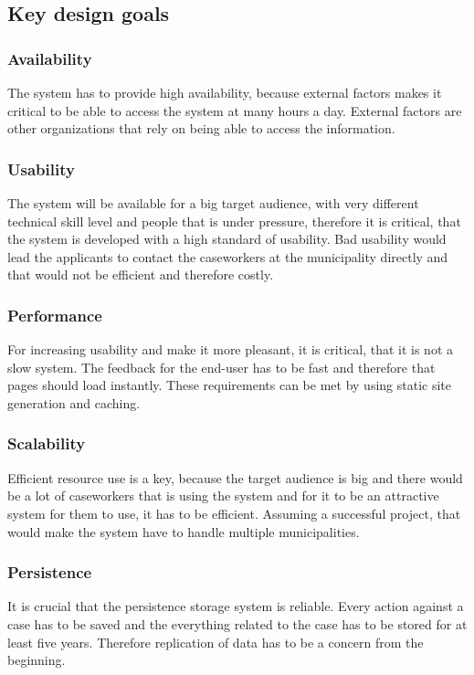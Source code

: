 \subsection{Key design goals}

\subsubsection{Availability}
The system has to provide high availability, because external factors makes it critical to be able to access the system at many hours a day. External factors are other organizations that rely on being able to access the information. 

\subsubsection{Usability}
The system will be available for a big target audience, with very different technical skill level and people that is under pressure, therefore it is critical, that the system is developed with a high standard of usability. Bad usability would lead the applicants to contact the caseworkers at the municipality directly and that would not be efficient and therefore costly. 

\subsubsection{Performance}
For increasing usability and make it more pleasant, it is critical, that it is not a slow system. The feedback for the end-user has to be fast and therefore that pages should load instantly. These requirements can be met by using static site generation and caching. 

\subsubsection{Scalability}
Efficient resource use is a key, because the target audience is big and there would be a lot of caseworkers that is using the system and for it to be an attractive system for them to use, it has to be efficient. Assuming a successful project, that would make the system have to handle multiple municipalities.

\subsubsection{Persistence}
It is crucial that the persistence storage system is reliable. Every action against a case has to be saved and the everything related to the case has to be stored for at least five years. Therefore replication of data has to be a concern from the beginning.
